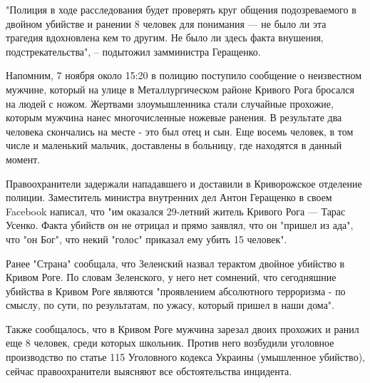 "Полиция в ходе расследования будет проверять круг общения подозреваемого в
двойном убийстве и ранении 8 человек для понимания --- не было ли эта трагедия
вдохновлена кем то другим. Не было ли здесь факта внушения, подстрекательства",
– подытожил замминистра Геращенко.

Напомним, 7 ноября около 15:20 в полицию поступило сообщение о неизвестном
мужчине, который на улице в Металлургическом районе Кривого Рога бросался на
людей с ножом. Жертвами злоумышленника стали случайные прохожие, которым
мужчина нанес многочисленные ножевые ранения. В результате два человека
скончались на месте - это был отец и сын. Еще восемь человек, в том числе и
маленький мальчик, доставлены в больницу, где находятся в данный момент.

Правоохранители задержали нападавшего и доставили в Криворожское отделение
полиции. Заместитель министра внутренних дел Антон Геращенко в своем Facebook
написал, что "им оказался 29-летний житель Кривого Рога --- Тарас Усенко. Факта
убийств он не отрицал и прямо заявлял, что он "пришел из ада", что "он Бог",
что некий "голос" приказал ему убить 15 человек".

Ранее "Страна" сообщала, что Зеленский назвал терактом двойное убийство в
Кривом Роге. По словам Зеленского, у него нет сомнений, что сегодняшние
убийства в Кривом Роге являются "проявлением абсолютного терроризма - по
смыслу, по сути, по результатам, по ужасу, который пришел в наши дома".

Также сообщалось, что в Кривом Роге мужчина зарезал двоих прохожих и ранил еще
8 человек, среди которых школьник. Против него возбудили уголовное производство
по статье 115 Уголовного кодекса Украины (умышленное убийство), сейчас
правоохранители выясняют все обстоятельства инцидента.
